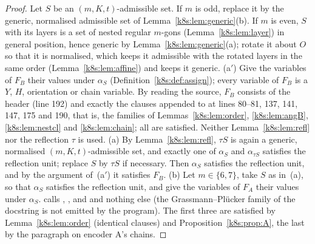 \begin{proof}
Let $S$ be an $(m,K,t)$-admissible set. If $m$ is odd, replace it by the generic, normalised admissible set of
Lemma~\ref{k8s:lem:generic}(b). If $m$ is even, $S$ with its layers is a set of nested regular $m$-gons
(Lemma~\ref{k8s:lem:layer}) in general position, hence generic by Lemma~\ref{k8s:lem:generic}(a); rotate it about $O$ so
that it is normalised, which keeps it admissible with the rotated layers in the same order (Lemma~\ref{k8s:lem:affine})
and keeps it generic.
(a$'$) Give the
variables of $F_B$ their values under $\alpha_S$ (Definition~\ref{k8s:def:assign}); every variable of $F_B$ is a $Y$,
$H$, orientation or chain variable. By reading the source, $F_B$ consists of the header (line 192) and exactly the
clauses appended to  at lines 80--81, 137, 141, 147, 175 and 190, that is, the families of
Lemmas~\ref{k8s:lem:order}, \ref{k8s:lem:angB}, \ref{k8s:lem:nestcl} and \ref{k8s:lem:chain}; all are satisfied.
Neither Lemma~\ref{k8s:lem:refl} nor the reflection $\tau$ is used.
(a) By Lemma~\ref{k8s:lem:refl}, $\tau S$ is again a generic, normalised $(m,K,t)$-admissible set, and exactly one of
$\alpha_S$ and $\alpha_{\tau S}$ satisfies the reflection unit; replace $S$ by $\tau S$ if necessary. Then $\alpha_S$
satisfies the reflection unit, and by the argument of~(a$'$) it satisfies $F_B$.
(b) Let $m\in\{6,7\}$, take $S$ as in~(a), so that $\alpha_S$ satisfies the reflection unit, and give the variables of
$F_A$ their values under $\alpha_S$.  calls , ,  and  and nothing else (the
Grassmann--Pl\"ucker family of the docstring is not emitted by the program). The first three are satisfied by
Lemma~\ref{k8s:lem:order} (identical clauses) and Proposition~\ref{k8s:prop:A}, the last by the paragraph on encoder
A's chains.
\end{proof}

